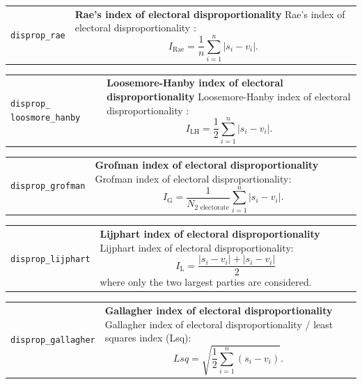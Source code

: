 \documentclass[
]{scrartcl}
\begin{document}
\begin{longtable}{p{3.2cm}| p{11cm}}
\texttt{disprop\_rae} &\textbf{Rae's index of electoral disproportionality}\newline 
Rae's index of electoral disproportionality \parencite{raePoliticalConsequencesElectoral1971}:
           \begin{equation}I_{\text{Rae}} = \frac{1}{n}\sum_{i = 1}^{n}|s_i - v_i|.\end{equation}
\end{longtable}

\begin{longtable}{p{3.2cm}| p{11cm}}
\texttt{disprop\_
loosmore\_hanby} &\textbf{Loosemore-Hanby index of electoral disproportionality}\newline 
Loosemore-Hanby index of electoral disproportionality \parencite{loosemoreTheoreticalLimitsMaximum1971}:
           \begin{equation}I_{\text{LH}} = \frac{1}{2}\sum_{i = 1}^{n}|s_i - v_i|.\end{equation}
\end{longtable}

\begin{longtable}{p{3.2cm}| p{11cm}}
\texttt{disprop\_grofman} &\textbf{Grofman index of electoral disproportionality}\newline 
Grofman index of electoral disproportionality:
           \begin{equation}I_{\text{G}} = \frac{1}{N_{2\text{ electorate}}}\sum_{i=1}^{n}|s_i - v_i|.\end{equation}
\end{longtable}

\begin{longtable}{p{3.2cm}| p{11cm}}
\texttt{disprop\_lijphart} &\textbf{Lijphart index of electoral disproportionality}\newline 
Lijphart index of electoral disproportionality:
           \begin{equation}I_{\text{L}} = \frac{|s_i - v_i| + |s_i - v_i|}{2}\end{equation}
           where only the two largest parties are considered.
\end{longtable}

\begin{longtable}{p{3.2cm}| p{11cm}}
\texttt{disprop\_gallagher} &\textbf{Gallagher index of electoral disproportionality}\newline 
Gallagher index of electoral disproportionality / least squares index (Lsq):
          \begin{equation}Lsq = \sqrt{\frac{1}{2}\sum_{i = 1}^{n}\left(s_i - v_i\right)}.\end{equation}
\end{longtable}
\end{document}

